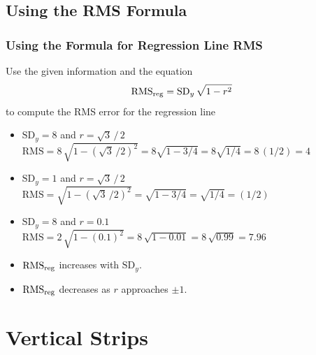 \documentclass[t]{beamer}
\begin{document}
\subsection{Using the RMS Formula}
\begin{frame}
\frametitle{Using the Formula for Regression Line RMS}

\footnotesize

Use the given information and the equation\vspace{-4pt}
\[\mbox{RMS}_{\scriptsize \mbox{reg}} = \mbox{SD}_y\,\sqrt{1-r^2}\vspace{-4pt}\]
to compute the RMS error for the regression line 

  \begin{itemize}
   \item<2-> \footnotesize $\mbox{SD}_y=8$ and $r=\sqrt{3}\,/\,2$\\
      $\mbox{RMS} = 8\,\sqrt{1 - \left(\sqrt{3}\,/2\right)^2} = 
     8\sqrt{1 - 3/4} = 8\sqrt{1/4} = 8\,(1/2) = 4$\vspace{5pt}
%
   \item<3-> \footnotesize $\mbox{SD}_y=1$ and $r=\sqrt{3}\,/\,2$\\
      $\mbox{RMS} = \sqrt{1 - \left(\sqrt{3}\,/2\right)^2} = 
     \sqrt{1 - 3/4} = \sqrt{1/4} = (1/2)$\vspace{5pt}
%
   \item<4-> \footnotesize $\mbox{SD}_y=8$ and $r=0.1$\vspace{3pt}\\
      $\mbox{RMS} = 2\,\sqrt{1 - (0.1)^2} = 
      8\,\sqrt{1 - 0.01} = 8\,\sqrt{0.99}=7.96$\vspace{5pt}
\item<5-> $\mbox{RMS}_{\scriptsize \mbox{reg}}$ increases with $\mbox{SD}_y$.
\item<6-> $\mbox{RMS}_{\scriptsize \mbox{reg}}$ decreases as $r$ approaches $\pm 1$.
\end{itemize}

\end{frame}

\section{Vertical Strips}
\end{document}
